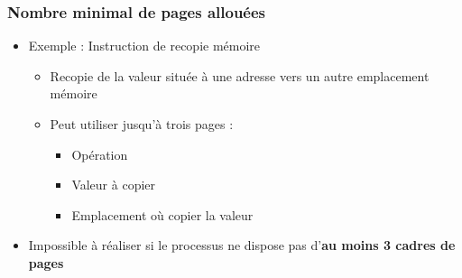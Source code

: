 \begin{frame}
\frametitle{Nombre minimal de pages allouées}
\begin{itemize}
\item Exemple : Instruction de recopie mémoire 
\begin{itemize}
\item Recopie de la valeur située à une adresse vers un autre emplacement mémoire
\item Peut utiliser jusqu'à trois pages :
\begin{itemize}
\item Opération
\item Valeur à copier
\item Emplacement où copier la valeur
\end{itemize}
\end{itemize}
\item Impossible à réaliser si le processus ne dispose pas d'\textbf{au moins 3 cadres de pages}
\end{itemize}
\end{frame}


%
%
%


